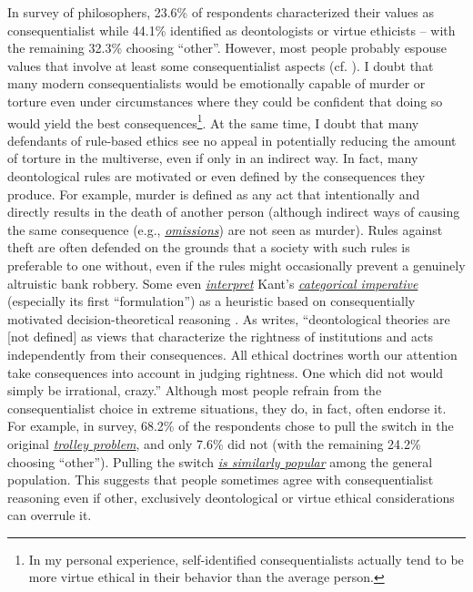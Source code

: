 In \parencite{Bourget2014-fm} survey of philosophers, 23.6\%
of respondents characterized their values as consequentialist while
44.1\% identified as deontologists or virtue ethicists -- with the
remaining 32.3\% choosing ``other''. However, most people probably
espouse values that involve at least some consequentialist aspects (cf.
\parencite{Muehlhauser2012-ib}). I doubt that many modern
consequentialists would be emotionally capable of murder or torture even
under circumstances where they could be confident that doing so would
yield the best consequences\footnote{In my personal experience,
  self-identified consequentialists actually tend to be more virtue
  ethical in their behavior than the average person.}. At the same time,
I doubt that many defendants of rule-based ethics see no appeal in
potentially reducing the amount of torture in the multiverse, even if
only in an indirect way. In fact, many deontological rules are motivated
or even defined by the consequences they produce. For example, murder is
defined as any act that intentionally and directly results in the death
of another person (although indirect ways of causing the same
consequence (e.g.,
\href{https://en.wikipedia.org/wiki/Omission_bias}{\emph{omissions}})
are not seen as murder). Rules against theft are often defended on the
grounds that a society with such rules is preferable to one without,
even if the rules might occasionally prevent a genuinely altruistic bank
robbery. Some even
\href{http://briantomasik.com/interpreting-the-categorical-imperative/\#Categorical_imperative_as_decision_theory}{\emph{interpret}}
Kant's
\href{https://en.wikipedia.org/wiki/Categorical_imperative}{\emph{categorical
imperative}} (especially its first ``formulation'') as a heuristic based
on consequentially motivated decision-theoretical reasoning
\parencite{Parfit2011-xj,Hare1993-gi}. As
\parencite{Rawls1971-sq} writes, ``deontological theories
are {[}not defined{]} as views that characterize the rightness of
institutions and acts independently from their consequences. All ethical
doctrines worth our attention take consequences into account in judging
rightness. One which did not would simply be irrational, crazy.''
Although most people refrain from the consequentialist choice in extreme
situations, they do, in fact, often endorse it. For example, in
\parencite{Bourget2014-fm} survey, 68.2\% of the respondents
chose to pull the switch in the original
\href{https://en.wikipedia.org/wiki/Trolley_problem}{\emph{trolley
problem}}, and only 7.6\% did not (with the remaining 24.2\% choosing
``other''). Pulling the switch
\href{https://en.wikipedia.org/wiki/Trolley_problem\#Psychology}{\emph{is
similarly popular}} among the general population. This suggests that
people sometimes agree with consequentialist reasoning even if other,
exclusively deontological or virtue ethical considerations can overrule
it.

